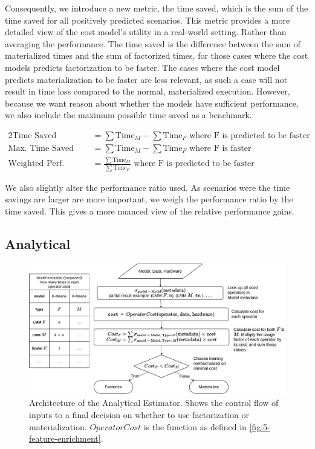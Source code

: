 Consequently, we introduce a new metric, the time saved, which is the sum of the time saved for all positively predicted scenarios. This metric provides a more detailed view of the cost model's utility in a real-world setting. Rather than averaging the performance. The time saved is the difference between the sum of materialized times and the sum of factorized times, for those cases where the cost models predicts factorization to be faster. The cases where the cost model predicts materialization to be faster are less relevant, as such a case will not result in time loss compared to the normal, materialized execution. However, because we want reason about whether the models have sufficient performance, we also include the maximum possible time saved as a benchmark.

\begin{alignat*}{2}
    \text{Time Saved}           & = \sum \text{Time}_M - \sum \text{Time}_F \text{ where F is predicted to be faster}       \\
    \text{Max. Time Saved}      & = \sum \text{Time}_M - \sum \text{Time}_F  \text{ where F is faster}                      \\
    \text{Weighted Perf. Ratio} & = \frac{\sum \text{Time}_M}{\sum \text{Time}_F} \text{ where F is predicted to be faster}
\end{alignat*}

We also slightly alter the performance ratio used. As scenarios were the time savings are larger are more important, we weigh the performance ratio by the time saved. This gives a more nuanced view of the relative performance gains.

\subsection{Analytical}
\label{subsec:5-analytical}
\begin{figure}[ht]
    \centering
    \includegraphics[width=\linewidth]{chapters/05_cost_estimation/figures/analytical-architecture.pdf}
    \caption[Analytical Estimator Architecture]{Architecture of the Analytical Estimator. Shows the control flow of inputs to a final decision on whether to use factorization or materialization. $OperatorCost$ is the function as defined in \autoref{fig:5-feature-enrichment}.}
    \label{fig:5-analytical-architecture}
\end{figure}

